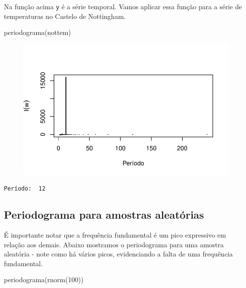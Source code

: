 \documentclass[
  letterpaper,
  DIV=11,
  numbers=noendperiod]{scrreprt}
\newenvironment{Shaded}{\begin{snugshade}}{\end{snugshade}}
\newcommand{\DecValTok}[1]{\textcolor[rgb]{0.68,0.00,0.00}{#1}}
\newcommand{\FunctionTok}[1]{\textcolor[rgb]{0.28,0.35,0.67}{#1}}
\newcommand{\NormalTok}[1]{\textcolor[rgb]{0.00,0.23,0.31}{#1}}
\begin{document}
Na função acima \texttt{y} é a série temporal. Vamos aplicar essa função
para a série de temperaturas no Castelo de Nottingham.

\begin{Shaded}
\begin{Highlighting}[]
\FunctionTok{periodograma}\NormalTok{(nottem)}
\end{Highlighting}
\end{Shaded}

\begin{figure}[H]

{\centering \includegraphics{ferramentas_files/figure-pdf/unnamed-chunk-11-1.pdf}

}

\end{figure}

\begin{verbatim}
Período:  12 
\end{verbatim}

\hypertarget{periodograma-para-amostras-aleatuxf3rias}{%
\subsection{Periodograma para amostras
aleatórias}\label{periodograma-para-amostras-aleatuxf3rias}}

É importante notar que a frequência fundamental é um pico expressivo em
relação aos demais. Abaixo mostramos o periodograma para uma amostra
aleatória - note como há vários picos, evidenciando a falta de uma
frequência fundamental.

\begin{Shaded}
\begin{Highlighting}[]
\FunctionTok{periodograma}\NormalTok{(}\FunctionTok{rnorm}\NormalTok{(}\DecValTok{100}\NormalTok{))}
\end{Highlighting}
\end{Shaded}
\end{document}
